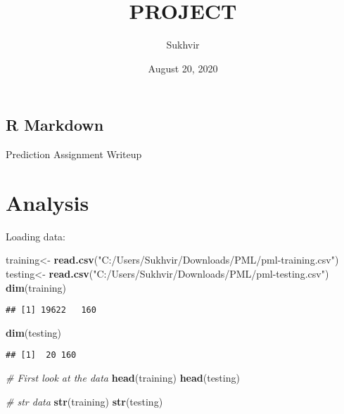 \documentclass[]{article}
\title{PROJECT}
\author{Sukhvir}
\date{August 20, 2020}
\newenvironment{Shaded}{\begin{snugshade}}{\end{snugshade}}
\newcommand{\CommentTok}[1]{\textcolor[rgb]{0.56,0.35,0.01}{\textit{#1}}}
\newcommand{\KeywordTok}[1]{\textcolor[rgb]{0.13,0.29,0.53}{\textbf{#1}}}
\newcommand{\NormalTok}[1]{#1}
\newcommand{\StringTok}[1]{\textcolor[rgb]{0.31,0.60,0.02}{#1}}
\begin{document}
\maketitle

\hypertarget{r-markdown}{%
\subsection{R Markdown}\label{r-markdown}}

Prediction Assignment Writeup

\hypertarget{analysis}{%
\section{Analysis}\label{analysis}}

Loading data:

\begin{Shaded}
\begin{Highlighting}[]
\NormalTok{training<-}\StringTok{ }\KeywordTok{read.csv}\NormalTok{(}\StringTok{"C:/Users/Sukhvir/Downloads/PML/pml-training.csv"}\NormalTok{)}
\NormalTok{testing<-}\StringTok{ }\KeywordTok{read.csv}\NormalTok{(}\StringTok{"C:/Users/Sukhvir/Downloads/PML/pml-testing.csv"}\NormalTok{)}
\KeywordTok{dim}\NormalTok{(training)}
\end{Highlighting}
\end{Shaded}

\begin{verbatim}
## [1] 19622   160
\end{verbatim}

\begin{Shaded}
\begin{Highlighting}[]
\KeywordTok{dim}\NormalTok{(testing)}
\end{Highlighting}
\end{Shaded}

\begin{verbatim}
## [1]  20 160
\end{verbatim}

\begin{Shaded}
\begin{Highlighting}[]
\CommentTok{# First look at the data}
\KeywordTok{head}\NormalTok{(training)}
\KeywordTok{head}\NormalTok{(testing)}
\end{Highlighting}
\end{Shaded}

\begin{Shaded}
\begin{Highlighting}[]
\CommentTok{# str data}
\KeywordTok{str}\NormalTok{(training)}
\KeywordTok{str}\NormalTok{(testing)}
\end{Highlighting}
\end{Shaded}
\end{document}
